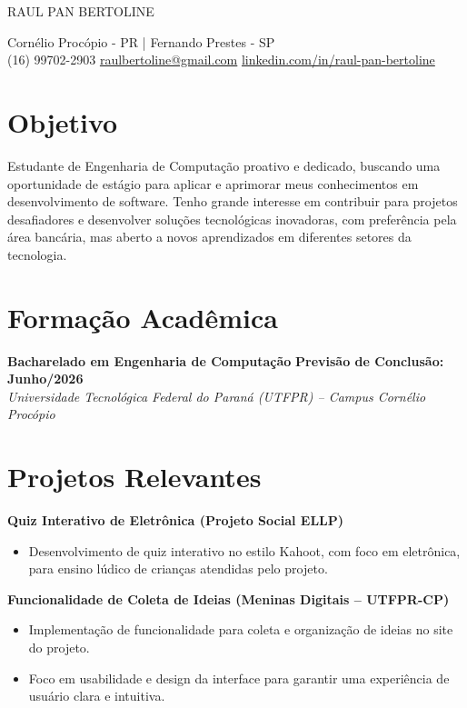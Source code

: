 \documentclass[10pt, a4paper]{article}
\begin{document}
\begin{center}
    {\Huge \scshape RAUL PAN BERTOLINE} %
    \vspace{4pt} %

    Cornélio Procópio - PR | Fernando Prestes - SP \\
    (16) 99702-2903 \textbullet{}
    \href{mailto:raulbertoline@gmail.com}{raulbertoline@gmail.com} \textbullet{}
    \href{https://www.linkedin.com/in/raul-pan-bertoline}{linkedin.com/in/raul-pan-bertoline}
\end{center}


\section*{Objetivo}
Estudante de Engenharia de Computação proativo e dedicado, buscando uma oportunidade de estágio para aplicar e aprimorar meus conhecimentos em desenvolvimento de software. Tenho grande interesse em contribuir para projetos desafiadores e desenvolver soluções tecnológicas inovadoras, com preferência pela área bancária, mas aberto a novos aprendizados em diferentes setores da tecnologia.


\section*{Formação Acadêmica}
\textbf{Bacharelado em Engenharia de Computação} \hfill \textbf{Previsão de Conclusão: Junho/2026} \\
\textit{Universidade Tecnológica Federal do Paraná (UTFPR) – Campus Cornélio Procópio}


\section*{Projetos Relevantes}
\textbf{Quiz Interativo de Eletrônica (Projeto Social ELLP)}
\begin{itemize}
    \item Desenvolvimento de quiz interativo no estilo Kahoot, com foco em eletrônica, para ensino lúdico de crianças atendidas pelo projeto.
\end{itemize}

\vspace{5pt} %

\textbf{Funcionalidade de Coleta de Ideias (Meninas Digitais – UTFPR-CP)}
\begin{itemize}
    \item Implementação de funcionalidade para coleta e organização de ideias no site do projeto.
    \item Foco em usabilidade e design da interface para garantir uma experiência de usuário clara e intuitiva.
\end{itemize}
\end{document}
